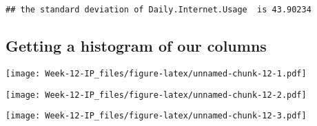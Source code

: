 \documentclass[
]{article}
\newenvironment{Shaded}{\begin{snugshade}}{\end{snugshade}}
\newcommand{\AttributeTok}[1]{\textcolor[rgb]{0.77,0.63,0.00}{#1}}
\newcommand{\FunctionTok}[1]{\textcolor[rgb]{0.00,0.00,0.00}{#1}}
\newcommand{\NormalTok}[1]{#1}
\newcommand{\SpecialCharTok}[1]{\textcolor[rgb]{0.00,0.00,0.00}{#1}}
\newcommand{\StringTok}[1]{\textcolor[rgb]{0.31,0.60,0.02}{#1}}
\begin{document}
\begin{verbatim}
## the standard deviation of Daily.Internet.Usage  is 43.90234
\end{verbatim}

\hypertarget{getting-a-histogram-of-our-columns}{%
\subsection{Getting a histogram of our
columns}\label{getting-a-histogram-of-our-columns}}

\begin{Shaded}
\end{Shaded}

\texttt{[image: Week-12-IP\_files/figure-latex/unnamed-chunk-12-1.pdf]}

\begin{Shaded}
\end{Shaded}

\texttt{[image: Week-12-IP\_files/figure-latex/unnamed-chunk-12-2.pdf]}

\begin{Shaded}
\end{Shaded}

\texttt{[image: Week-12-IP\_files/figure-latex/unnamed-chunk-12-3.pdf]}

\begin{Shaded}
\end{Shaded}
\end{document}
